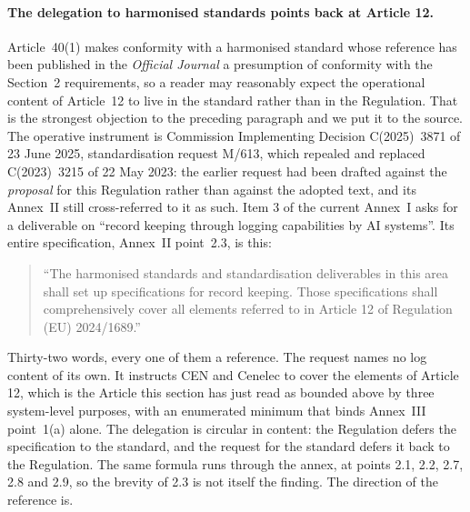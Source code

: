 \documentclass[11pt]{article}
\theoremstyle{remark}
\begin{document}
\paragraph{The delegation to harmonised standards points back at Article 12.}
Article~40(1) makes conformity with a harmonised standard whose reference has
been published in the \emph{Official Journal} a presumption of conformity with
the Section~2 requirements, so a reader may reasonably expect the operational
content of Article~12 to live in the standard rather than in the Regulation.
That is the strongest objection to the preceding paragraph and we put it to the
source. The operative instrument is Commission Implementing Decision
C(2025)~3871 of 23 June 2025, standardisation request M/613, which repealed and
replaced C(2023)~3215 of 22 May 2023: the earlier request had been drafted
against the \emph{proposal} for this Regulation rather than against the adopted
text, and its Annex~II still cross-referred to it as such. Item 3 of the current
Annex~I asks for a deliverable on ``record keeping through logging capabilities
by AI systems''. Its entire specification, Annex~II point~2.3, is this:

\begin{quote}
``The harmonised standards and standardisation deliverables in this area shall
set up specifications for record keeping. Those specifications shall
comprehensively cover all elements referred to in Article 12 of Regulation (EU)
2024/1689.''
\end{quote}

Thirty-two words, every one of them a reference. The request names no log content
of its own. It instructs CEN and Cenelec to cover the elements of Article 12,
which is the Article this section has just read as bounded above by three
system-level purposes, with an enumerated minimum that binds Annex~III
point~1(a) alone. The delegation is circular in content: the Regulation defers
the specification to the standard, and the request for the standard defers it
back to the Regulation. The same formula runs through the annex, at points 2.1,
2.2, 2.7, 2.8 and 2.9, so the brevity of 2.3 is not itself the finding. The
direction of the reference is.
\end{document}
